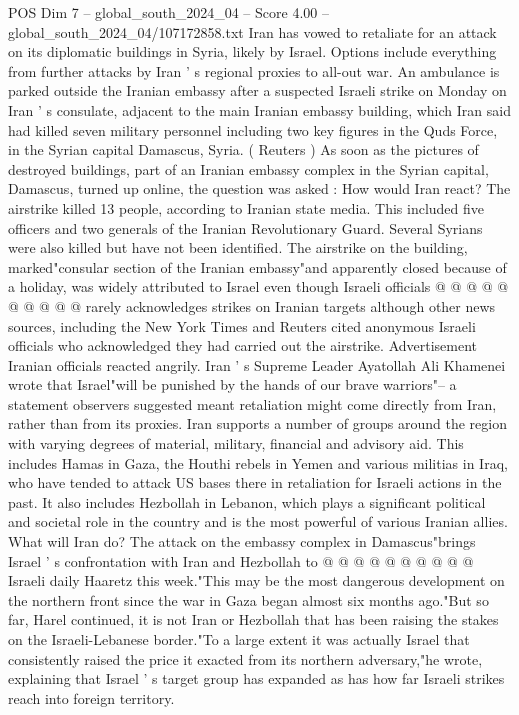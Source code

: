\begin{textsample}{POS Dim 7 – global\_south\_2024\_04 – Score 4.00 – global\_south\_2024\_04/107172858.txt}  \label{ex:f7_pos_176}
Iran has vowed to retaliate for an attack on its diplomatic buildings in Syria, likely by Israel.
Options include everything from further attacks by Iran ' s regional proxies to all-out war.
An ambulance is parked outside the Iranian embassy after a suspected Israeli strike on Monday on Iran ' s consulate, adjacent to the main Iranian embassy building, which Iran said had killed seven military personnel including two key figures in the Quds Force, in the Syrian capital Damascus, Syria. ( Reuters ) As soon as the pictures of destroyed buildings, part of an Iranian embassy complex in the Syrian capital, Damascus, turned up online, the question was asked : How would Iran react?
The airstrike killed 13 people, according to Iranian state media.
This included five officers and two generals of the Iranian Revolutionary Guard.
Several Syrians were also killed but have not been identified.
The airstrike on the building, marked"consular section of the Iranian embassy"and apparently closed because of a holiday, was widely attributed to Israel even though Israeli officials @ @ @ @ @ @ @ @ @ @ rarely acknowledges strikes on Iranian targets although other news sources, including the New York Times and Reuters cited anonymous Israeli officials who acknowledged they had carried out the airstrike.
Advertisement Iranian officials reacted angrily.
Iran ' s Supreme Leader Ayatollah Ali Khamenei wrote that Israel"will be punished by the hands of our brave warriors"-- a statement observers suggested meant retaliation might come directly from Iran, rather than from its proxies.
Iran supports a number of groups around the region with varying degrees of material, military, financial and advisory aid.
This includes Hamas in Gaza, the Houthi rebels in Yemen and various militias in Iraq, who have tended to attack US bases there in retaliation for Israeli actions in the past.
It also includes Hezbollah in Lebanon, which plays a significant political and societal role in the country and is the most powerful of various Iranian allies.
What will Iran do?
The attack on the embassy complex in Damascus"brings Israel ' s confrontation with Iran and Hezbollah to @ @ @ @ @ @ @ @ @ @ Israeli daily Haaretz this week."This may be the most dangerous development on the northern front since the war in Gaza began almost six months ago."But so far, Harel continued, it is not Iran or Hezbollah that has been raising the stakes on the Israeli-Lebanese border."To a large extent it was actually Israel that consistently raised the price it exacted from its northern adversary,"he wrote, explaining that Israel ' s target group has expanded as has how far Israeli strikes reach into foreign territory.

\end{textsample}
